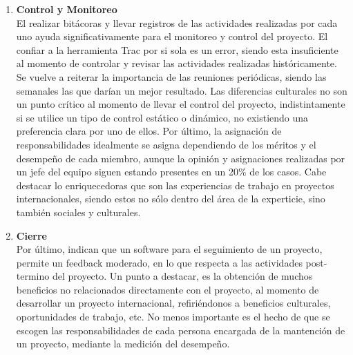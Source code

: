 \begin{enumerate}
\item \textbf{Control y Monitoreo}\\
El realizar bitácoras y llevar registros de las actividades realizadas por
cada uno ayuda significativamente para el monitoreo y control del proyecto. El
confiar a la herramienta Trac por si sola es un error, siendo esta
insuficiente al momento de controlar y revisar las actividades realizadas
históricamente. Se vuelve a reiterar la importancia de las reuniones
periódicas, siendo las semanales las que darían un mejor resultado. Las
diferencias culturales no son un punto crítico al momento de llevar el control
del proyecto, indistintamente si se utilice un tipo de control estático o
dinámico, no existiendo una preferencia clara por uno de ellos. Por último,
la asignación de responsabilidades idealmente se asigna dependiendo de los méritos y el
desempeño de cada miembro, aunque la opinión y asignaciones realizadas por un
jefe del equipo siguen estando presentes en un 20\% de los casos. Cabe
destacar lo enriquecedoras que son las experiencias de trabajo en proyectos
internacionales, siendo estos no sólo dentro del área de la experticie, sino
también sociales y culturales.

\item \textbf{Cierre}\\
Por último, indican que un software para el seguimiento de un proyecto, permite un feedback moderado,
en lo que respecta a las actividades post-termino del proyecto. Un punto a destacar, es la obtención
de muchos beneficios no relacionados directamente con el proyecto, al momento de desarrollar
un proyecto internacional, refiriéndonos a beneficios culturales, oportunidades de trabajo, etc. 
No menos importante es el hecho de que se escogen las responsabilidades de cada persona encargada 
de la mantención de un proyecto, mediante la medición del desempeño.
\end{enumerate}

